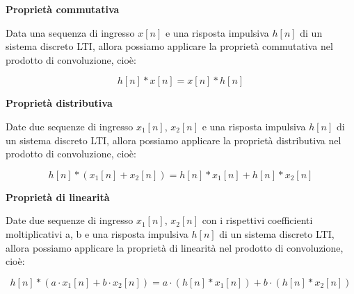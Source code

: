 \textbf{Proprietà commutativa} \newline 

Data una sequenza di ingresso $x \left[ n\right]$ e una risposta impulsiva $h \left[ n\right]$ di un sistema discreto LTI, 
allora possiamo applicare la proprietà commutativa nel prodotto di convoluzione, cioè: 

{
    \Large 
    \begin{equation}
        h \left[ n\right]
        *
        x \left[ n\right]
        =
        x \left[ n\right]
        *
        h \left[ n\right] 
    \end{equation}
}

\textbf{Proprietà distributiva} \newline 

Date due sequenze di ingresso $x_1 \left[ n\right]$, $x_2 \left[ n\right]$ e una risposta impulsiva $h \left[ n\right]$ di un sistema discreto LTI, 
allora possiamo applicare la proprietà distributiva nel prodotto di convoluzione, cioè: 

{
    \Large 
    \begin{equation}
        h \left[ n\right]
        *
        \left( 
            x_1 \left[ n\right] 
            +
            x_2 \left[ n\right]
        \right)
        = 
        h \left[ n\right]
        *
        x_1 \left[ n\right]
        +
        h \left[ n\right]
        *
        x_2 \left[ n\right]
    \end{equation}
} 

\textbf{Proprietà di linearità} \newline 

Date due sequenze di ingresso $x_1 \left[ n\right]$, $x_2 \left[ n\right]$ con i rispettivi coefficienti moltiplicativi a, b e una risposta impulsiva $h \left[ n\right]$ di un sistema discreto LTI, 
allora possiamo applicare la proprietà di linearità nel prodotto di convoluzione, cioè: 

{
    \Large 
    \begin{equation}
        h \left[ n\right]
        *
        \left( 
            a 
            \cdot
            x_1 \left[ n\right] 
            +
            b 
            \cdot
            x_2 \left[ n\right]
        \right)
        = 
        a 
        \cdot 
        \left( 
        h \left[ n\right]
        *
        x_1 \left[ n\right]
        \right)
        +
        b 
        \cdot 
        \left(
        h \left[ n\right]
        *
        x_2 \left[ n\right]
        \right)
    \end{equation}
}

